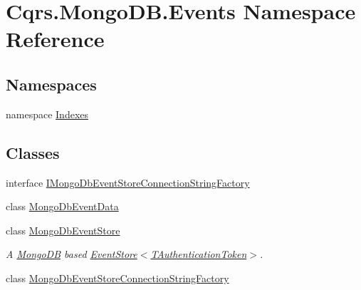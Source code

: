 \hypertarget{namespaceCqrs_1_1MongoDB_1_1Events}{}\section{Cqrs.\+Mongo\+D\+B.\+Events Namespace Reference}
\label{namespaceCqrs_1_1MongoDB_1_1Events}
\subsection*{Namespaces}
\begin{DoxyCompactItemize}
\item 
namespace \hyperlink{namespaceCqrs_1_1MongoDB_1_1Events_1_1Indexes}{Indexes}
\end{DoxyCompactItemize}
\subsection*{Classes}
\begin{DoxyCompactItemize}
\item 
interface \hyperlink{interfaceCqrs_1_1MongoDB_1_1Events_1_1IMongoDbEventStoreConnectionStringFactory}{I\+Mongo\+Db\+Event\+Store\+Connection\+String\+Factory}
\item 
class \hyperlink{classCqrs_1_1MongoDB_1_1Events_1_1MongoDbEventData}{Mongo\+Db\+Event\+Data}
\item 
class \hyperlink{classCqrs_1_1MongoDB_1_1Events_1_1MongoDbEventStore}{Mongo\+Db\+Event\+Store}
\begin{DoxyCompactList}\small\item\em A \hyperlink{namespaceCqrs_1_1MongoDB}{Mongo\+DB} based \hyperlink{classCqrs_1_1Events_1_1EventStore_a6346cb2aea4c5b4e740dc6cfb15abab8}{Event\+Store$<$\+T\+Authentication\+Token$>$}. \end{DoxyCompactList}\item 
class \hyperlink{classCqrs_1_1MongoDB_1_1Events_1_1MongoDbEventStoreConnectionStringFactory}{Mongo\+Db\+Event\+Store\+Connection\+String\+Factory}
\end{DoxyCompactItemize}
